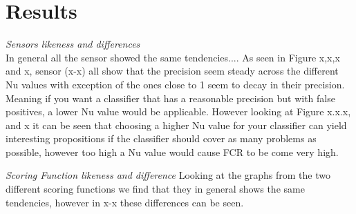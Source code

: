\section{Results}


\textit{Sensors likeness and differences}\\
In general all the sensor showed the same tendencies....
As seen in Figure x,x,x and x, sensor (x-x) all show that the precision seem steady across the different Nu values with exception of the ones close to 1 seem to decay in their precision. Meaning if you want a classifier that has a reasonable precision but with false positives, a lower Nu value would be applicable.
However looking at Figure x.x.x, and x it can be seen that choosing a higher Nu value for your classifier can yield interesting propositions if the classifier should cover as many problems as possible, however too high a Nu value would cause FCR to be come very high.


\textit{Scoring Function likeness and difference}
Looking at the graphs from the two different scoring functions we find that they in general shows the same tendencies, however in x-x these differences can be seen. 
